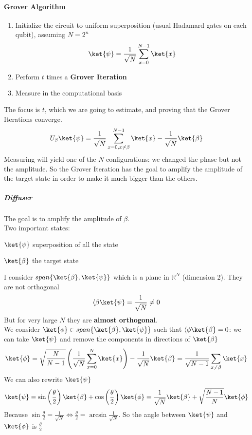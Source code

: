 \documentclass[10pt]{report}
\begin{document}
\paragraph{Grover Algorithm}
\begin{enumerate}
	\item Initialize the circuit to uniform superposition (usual Hadamard gates on each qubit), assuming $N=2^n$
	$$\ket{\psi}=\frac{1}{\sqrt{N}}\sum_{x=0}^{N-1}\ket{x}$$
	\item Perform $t$ times a \textbf{Grover Iteration}
	\item Measure in the computational basis
\end{enumerate}
The focus is $t$, which we are going to estimate, and proving that the Grover Iterations converge.
$$U_\beta\ket{\psi} = \frac{1}{\sqrt{N}}\sum_{x=0,x\neq\beta}^{N-1}\ket{x} - \frac{1}{\sqrt{N}}\ket{\beta}$$
Measuring will yield one of the $N$ configurations: we changed the phase but not the amplitude. So the Grover Iteration has the goal to amplify the amplitude of the target state in order to make it much bigger than the others.
\subparagraph{Diffuser} The goal is to amplify the amplitude of $\beta$.\\
Two important states:
\begin{list}{}{}
	\item $\ket{\psi}$ superposition of all the state
	\item $\ket{\beta}$ the target state
\end{list}
I consider $span\{\ket{\beta},\ket{\psi}\}$ which is a plane in $\mathbb{R}^N$ (dimension 2). They are not orthogonal
$$\langle\beta\ket{\psi} = \frac{1}{\sqrt{N}}\neq 0$$
But for very large $N$ they are \textbf{almost orthogonal}.\\
We consider $\ket{\phi}\in span\{\ket{\beta},\ket{\psi}\}$ such that $\langle\phi\ket{\beta}=0$: we can take $\ket{\psi}$ and remove the components in directions of $\ket{\beta}$
$$\ket{\phi}=\sqrt{\frac{N}{N-1}}\left(\frac{1}{\sqrt{N}}\sum_{x=0}^N\ket{x}\right)-\frac{1}{\sqrt{N}}\ket{\beta} = \frac{1}{\sqrt{N-1}}\sum_{x\neq\beta}\ket{x}$$
We can also rewrite $\ket{\psi}$
$$\ket{\psi} = \sin\left(\frac{\theta}{2}\right)\ket{\beta} + \cos\left(\frac{\theta}{2}\right)\ket{\phi} = \frac{1}{\sqrt{N}}\ket{\beta} + \sqrt{\frac{N-1}{N}}\ket{\phi}$$
Because $\sin\frac{\theta}{2} = \frac{1}{\sqrt{N}}\Leftrightarrow\frac{\theta}{2}=\arcsin\frac{1}{\sqrt{N}}$. So the angle between $\ket{\psi}$ and $\ket{\phi}$ is $\frac{\theta}{2}$
\end{document}
